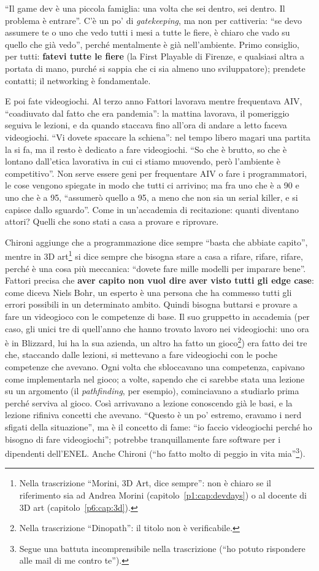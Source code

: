 ``Il game dev è una piccola famiglia: una volta che sei dentro, sei dentro. Il
problema è entrare''. C'è un po' di \emph{gatekeeping}, ma non per cattiveria:
``se devo assumere te o uno che vedo tutti i mesi a tutte le fiere, è chiaro
che vado su quello che già vedo'', perché mentalmente è già nell'ambiente.
Primo consiglio, per tutti: \textbf{fatevi tutte le fiere} (la First Playable
di Firenze, e qualsiasi altra a portata di mano, purché si sappia che ci sia
almeno uno sviluppatore); prendete contatti; il networking è fondamentale.

E poi fate videogiochi. Al terzo anno Fattori lavorava mentre frequentava
AIV, ``coadiuvato dal fatto che era pandemia'': la mattina lavorava, il
pomeriggio seguiva le lezioni, e da quando staccava fino all'ora di andare a
letto faceva videogiochi. ``Vi dovete spaccare la schiena'': nel tempo libero
magari una partita la si fa, ma il resto è dedicato a fare videogiochi. ``So
che è brutto, so che è lontano dall'etica lavorativa in cui ci stiamo
muovendo, però l'ambiente è competitivo''. Non serve essere geni per
frequentare AIV o fare i programmatori, le cose vengono spiegate in modo che
tutti ci arrivino; ma fra uno che è a 90 e uno che è a 95, ``assumerò quello a
95, a meno che non sia un serial killer, e si capisce dallo sguardo''. Come in
un'accademia di recitazione: quanti diventano attori? Quelli che sono stati a
casa a provare e riprovare.

Chironi aggiunge che a programmazione dice sempre ``basta che abbiate
capito'', mentre in 3D art\footnote{Nella trascrizione ``Morini, 3D Art, dice
sempre'': non è chiaro se il riferimento sia ad Andrea Morini
(capitolo~\ref{p1:cap:devdays}) o al docente di 3D art
(capitolo~\ref{p6:cap:3d}).} si dice sempre che bisogna stare a casa a rifare,
rifare, rifare, perché è una cosa più meccanica: ``dovete fare mille modelli
per imparare bene''. Fattori precisa che \textbf{aver capito non vuol dire
aver visto tutti gli edge case}: come diceva Niels Bohr, un esperto è una
persona che ha commesso tutti gli errori possibili in un determinato ambito.
Quindi bisogna buttarsi e provare a fare un videogioco con le competenze di
base. Il suo gruppetto in accademia (per caso, gli unici tre di quell'anno che
hanno trovato lavoro nei videogiochi: uno ora è in Blizzard, lui ha la sua
azienda, un altro ha fatto un gioco\footnote{Nella trascrizione ``Dinopath'':
il titolo non è verificabile.}) era fatto dei tre che, staccando dalle
lezioni, si mettevano a fare videogiochi con le poche competenze che avevano.
Ogni volta che sbloccavano una competenza, capivano come implementarla nel
gioco; a volte, sapendo che ci sarebbe stata una lezione su un argomento (il
\emph{pathfinding}, per esempio), cominciavano a studiarlo prima perché
serviva al gioco. Così arrivavano a lezione conoscendo già le basi, e la
lezione rifiniva concetti che avevano. ``Questo è un po' estremo, eravamo i
nerd sfigati della situazione'', ma è il concetto di fame: ``io faccio
videogiochi perché ho bisogno di fare videogiochi''; potrebbe tranquillamente
fare software per i dipendenti dell'ENEL. Anche Chironi (``ho fatto molto di
peggio in vita mia''\footnote{Segue una battuta incomprensibile nella
trascrizione (``ho potuto rispondere alle mail di me contro te'').}).

